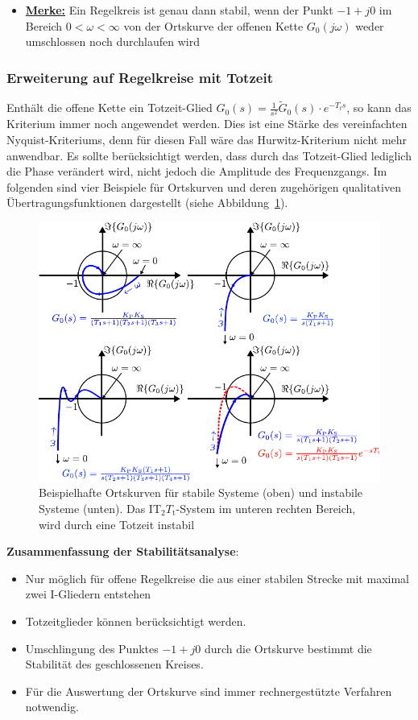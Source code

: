 %
\begin{itemize}
%
\item \underline{\textbf{Merke:}} Ein Regelkreis ist
genau dann stabil, wenn der Punkt $-1+j0$ im Bereich $0<\omega<\infty$ von der Ortskurve der offenen Kette $G_{0}(j\omega)$ weder umschlossen noch durchlaufen wird \cite{Foellinger94}
%
\end{itemize}
%
%
\subsubsection{Erweiterung auf Regelkreise mit Totzeit}
%
Enthält die offene Kette ein Totzeit-Glied $G_{0}(s)=\frac{1}{s^{2}}\tilde{G}_{0}(s)\cdot e^{-T_{t}s}$, so kann das Kriterium immer noch angewendet werden. Dies ist eine Stärke des vereinfachten Nyquist-Kriteriums, denn für diesen Fall wäre das Hurwitz-Kriterium nicht mehr anwendbar. Es sollte berücksichtigt werden, dass durch das Totzeit-Glied lediglich die Phase verändert wird, nicht jedoch die Amplitude des Frequenzgangs. Im folgenden sind vier Beispiele für Ortskurven und deren zugehörigen qualitativen Übertragungsfunktionen dargestellt (siehe Abbildung~\ref{fig:Beispiele}). 
%
\begin{figure}[h!]
	\centering
	\includegraphics[width=.95\linewidth]{Abbildungen/Systemanalyse/PDF/Ortskurven_Beispiele.pdf}
	\caption{Beispielhafte Ortskurven für stabile Systeme (oben) und instabile Systeme (unten). Das IT$_{2}T_{\text{t}}$-System im unteren rechten Bereich, wird durch eine Totzeit instabil}
	\label{fig:Beispiele}
\end{figure}
%
\newpage
%
\textbf{Zusammenfassung der Stabilitätsanalyse}:
\begin{itemize}
	\item Nur möglich für offene Regelkreise die aus einer stabilen Strecke mit maximal zwei I-Gliedern entstehen 
	\item Totzeitglieder können berücksichtigt werden.
	\item Umschlingung des Punktes $-1+j0$ durch die Ortskurve bestimmt die Stabilität des geschlossenen Kreises.
	\item Für die Auswertung der Ortskurve sind immer rechnergestützte Verfahren notwendig.
\end{itemize} 
%
